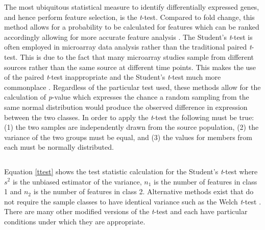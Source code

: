 {The most ubiquitous statistical measure to identify
differentially expressed genes, and hence perform feature selection, is the
\emph{t}-test.  Compared to fold change, this method allows for a probability
to be calculated for features which can be ranked accordingly allowing for more
accurate feature analysis \cite{PMID_164182572}. The Student's \emph{t}-test is
often employed in microarray data analysis rather than the traditional paired
\emph{t}-test.  This is due to the fact that many microarray studies sample
from different sources rather than the same source at different time points.
This makes the use of the paired \emph{t}-test inappropriate and the Student's
\emph{t}-test much more commonplace
\cite{ma2003gep,bueno2004dtp,PMID_14871811}. Regardless of the particular test
used, these methods allow for the calculation of \emph{p}-value which expresses
the chance a random sampling from the same normal distribution would produce
the observed difference in expression between the two classes. In order to
apply the \emph{t}-test the following must be true: (1) the two samples are
independently drawn from the source population, (2) the variance of the two
groups must be equal, and (3) the values for members from each must be normally
distributed.

\begin{equation} \label{ttest}
\end{equation}

Equation \eqref{ttest} shows the test statistic calculation for the Student's
\emph{t}-test where $s^2$ is the unbiased estimator of the variance, ${n}_1$ is
the number of features in class 1 and ${n}_2$ is the number of features in
class 2.  Alternative methods exist that do not require the sample classes to
have identical variance such as the Welch \emph{t}-test \cite{PMID_142249476}.
There are many other modified versions of the \emph{t}-test and each have
particular conditions under which they are appropriate.


}
